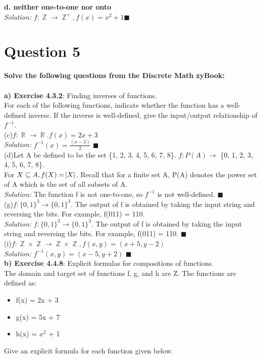 \documentclass[11pt]{article}
\DeclareMathOperator*{\R}{\mathbb{R}}\relax
\DeclareMathOperator*{\Z}{\mathbb{Z}}\relax
\begin{document}
		\textbf{d. neither one-to-one nor onto} \\
		\textit{Solution: }
		$f: \Z \rightarrow \Z^+, f(x) = x^2 + 1 \blacksquare$
	
	\newpage
	\section*{Question 5}
	\textbf{Solve the following questions from the Discrete Math zyBook:}\\
	\\
		\textbf{a) Exercise 4.3.2}: Finding inverses of functions.\\	
		For each of the following functions, indicate whether the function has a well-defined inverse. 
		If the inverse is well-defined, give the input/output relationship of $f^{-1}$.\\
		
		(c)$f: \R \rightarrow \R. f(x) = 2x + 3$ \\
		\textit{Solution: }
		$f^{-1} (x)= \frac{(x-3)}{2}$ $\blacksquare$\\
		
		(d)Let A be defined to be the set \{1, 2, 3, 4, 5, 6, 7, 8\}. $f: P(A) \rightarrow$ \{0, 1, 2, 3, 4, 5, 6, 7, 8\}. \\
		For $X \subseteq A, f(X) = \abs{X}$. Recall that for a finite set A, P(A) denotes the power set of A which is the set of all subsets of A. \\
		\textit{Solution: }
		The function f is not one-to-one, so $f^{-1}$ is not well-defined. $\blacksquare$\\
		
		(g)$f: \{0, 1\}^3\rightarrow\{0, 1\}^3$. The output of f is obtained by taking the input string and reversing the bits. For example, f(011) = 110. \\
		\textit{Solution: }
		$f: \{0, 1\}^3\rightarrow\{0, 1\}^3$. The output of f is obtained by taking the input string and reversing the bits. For example, f(011) = 110. $\blacksquare$ \\

		(i)$f: \Z \times \Z \rightarrow \Z \times \Z, f(x, y) = (x+5, y-2)$ \\
		\textit{Solution: }
		$f^{-1}(x, y) = (x-5, y+2)$ $\blacksquare$ \\
		
		\textbf{b) Exercise 4.4.8}: Explicit formulas for compositions of functions.\\	
		The domain and target set of functions f, g, and h are Z. The functions are defined as:
		\begin{itemize}
			\item f(x) = 2x + 3
			\item g(x) = 5x + 7
			\item h(x) = $x^2$ + 1
		\end{itemize}
		Give an explicit formula for each function given below.
		
\end{document}

